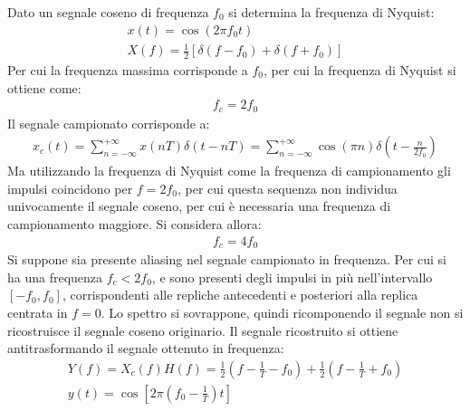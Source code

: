 \documentclass{article}
\begin{document}
Dato un segnale coseno di frequenza $f_0$ si determina la frequenza di Nyquist:
\begin{gather*}
    x(t)=\cos(2\pi f_0t)\\
    X(f)=\displaystyle\frac{1}{2}\left[\delta(f-f_0)+\delta(f+f_0)\right]
\end{gather*}
Per cui la frequenza massima corrisponde a $f_0$, per cui la frequenza di Nyquist si ottiene come:
\begin{gather}
    f_c=2f_0
\end{gather}
Il segnale campionato corrisponde a:
\begin{gather*}
    x_c(t)=\displaystyle\sum_{n=-\infty}^{+\infty}x(nT)\delta(t-nT)=\sum_{n=-\infty}^{+\infty}\cos(\pi n)\delta\left(t-\frac{n}{2f_0}\right)
\end{gather*}
Ma utilizzando la frequenza di Nyquist come la frequenza di campionamento gli impulsi coincidono per $f=2f_0$, per cui questa sequenza non individua univocamente il segnale 
coseno, per cui è necessaria una frequenza di campionamento maggiore. Si considera allora:
\begin{gather*}
    f_c=4f_0
\end{gather*}
Si suppone sia presente aliasing nel segnale campionato in frequenza. Per cui si ha una frequenza $f_c<2f_0$, e sono presenti degli impulsi in più nell'intervallo $[-f_0,f_0]$, 
corrispondenti alle repliche antecedenti e posteriori alla replica centrata in $f=0$. Lo spettro si sovrappone, quindi ricomponendo il segnale non si ricostruisce il 
segnale coseno originario. 
Il segnale ricostruito si ottiene antitrasformando il segnale ottenuto in frequenza:
\begin{gather*}
    Y(f)=X_c(f)H(f)=\displaystyle\frac{1}{2}\left(f-\frac{1}{T}-f_0\right)+\frac{1}{2}\left(f-\frac{1}{T}+f_0\right)\\
    y(t)=\cos\left[2\pi \left(f_0-\frac{1}{T}\right)t\right]
\end{gather*}
\end{document}
